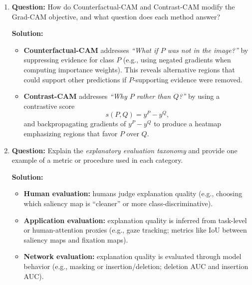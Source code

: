 \documentclass{article}
\begin{document}
\begin{enumerate}
\textbf{Solution:}  
Grad-CAM computes a class-specific heatmap using gradients of the class logit with respect to feature maps in the last convolutional layer:
\begin{enumerate}
    \item Forward pass to obtain feature maps $A^k$ and class logit $y^c$.
    \item Backward pass to compute gradients $\frac{\partial y^c}{\partial A^k_{ij}}$.
    \item Global-average pool gradients to obtain weights
    \[
    \alpha_k^c = \frac{1}{Z}\sum_i\sum_j \frac{\partial y^c}{\partial A^k_{ij}}.
    \]
    \item Combine weighted feature maps and apply ReLU:
    \[
    L_{\text{Grad-CAM}}^c = \mathrm{ReLU}\!\left(\sum_k \alpha_k^c A^k\right).
    \]
\end{enumerate}
The heatmap is then upsampled to input resolution for visualization.

\item \textbf{Question:}  
How do Counterfactual-CAM and Contrast-CAM modify the Grad-CAM objective, and what question does each method answer?

\textbf{Solution:}  
\begin{itemize}
    \item \textbf{Counterfactual-CAM} addresses \emph{``What if $P$ was not in the image?''} by suppressing evidence for class $P$ (e.g., using negated gradients when computing importance weights). This reveals alternative regions that could support other predictions if $P$-supporting evidence were removed.
    \item \textbf{Contrast-CAM} addresses \emph{``Why $P$ rather than $Q$?''} by using a contrastive score
    \[
    s(P,Q)=y^P-y^Q,
    \]
    and backpropagating gradients of $y^P-y^Q$ to produce a heatmap emphasizing regions that favor $P$ over $Q$.
\end{itemize}

\item \textbf{Question:}  
Explain the \emph{explanatory evaluation taxonomy} and provide one example of a metric or procedure used in each category.

\textbf{Solution:}  
\begin{itemize}
    \item \textbf{Human evaluation:} humans judge explanation quality (e.g., choosing which saliency map is ``cleaner'' or more class-discriminative).
    \item \textbf{Application evaluation:} explanation quality is inferred from task-level or human-attention proxies (e.g., gaze tracking; metrics like IoU between saliency maps and fixation maps).
    \item \textbf{Network evaluation:} explanation quality is evaluated through model behavior (e.g., masking or insertion/deletion; deletion AUC and insertion AUC).
\end{itemize}


\end{enumerate}
\end{document}
